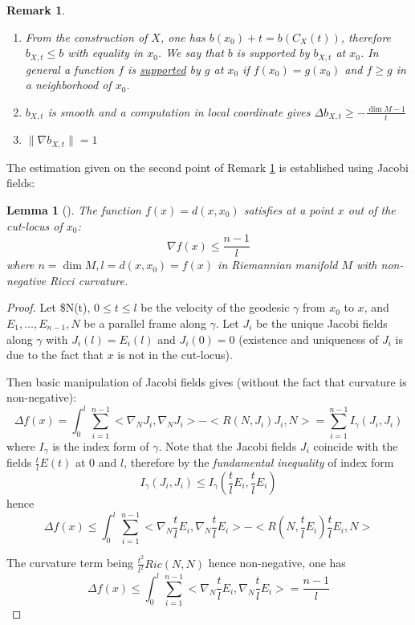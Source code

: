 \documentclass[11pt]{article}
\newtheorem{remark}{Remark}
\newtheorem{lemma}[theorem]{Lemma}
\begin{document}
\begin{remark}
\label{rem:3-calcul-cheeger-gromoll}
\label{org9362523}
\begin{enumerate}
\item From the construction of \(X\), one has \(b(x_0) + t = b(C_X(t))\), therefore \(b_{X,t} \leq b\) with
equality in \(x_0\). We say that \(b\) is supported by \(b_{X,t}\) at \(x_0\). In general a function \(f\) 
is \uline{supported} by \(g\) at \(x_0\) if \(f(x_0)=g(x_0)\) and \(f\geq g\) in a neighborhood of \(x_0\).
\item \(b_{X,t}\) is smooth and a computation in local coordinate gives \(\Delta b_{X,t} \geq -\frac{\dim
   M - 1}{t}\)
\item \(\|\nabla b_{X,t}\| = 1\)
\end{enumerate}
\end{remark}

The estimation given on the second point of Remark \ref{rem:3-calcul-cheeger-gromoll} is established
using Jacobi fields:

\begin{lemma}[]
The function \(f(x) = d(x,x_0)\) satisfies at a point \(x\) out of the cut-locus of \(x_0\):
\[
\nabla f(x) \leq \frac{n-1}{l}
\]
where \(n=\dim M, l = d(x,x_0) = f(x)\) in Riemannian manifold \(M\) with non-negative Ricci curvature.
\end{lemma}

\begin{proof}
Let \$N(t), \(0\leq t \leq l\) be the velocity of the geodesic \(\gamma\) from \(x_0\) to \(x\), and
\(E_1,\dots, E_{n-1},N\) be a parallel frame along \(\gamma\). Let \(J_i\) be the unique Jacobi
fields along \(\gamma\) with \(J_i(l) = E_i(l)\) and \(J_i(0)=0\) (existence and uniqueness of \(J_i\) is
due to the fact that \(x\) is not in the cut-locus).

Then basic manipulation of Jacobi fields gives (without the fact that curvature is non-negative):
\[
\Delta f(x) = \int_0^l \sum_{i=1}^{n-1}<\nabla_N J_i, \nabla_N J_i> - < R(N,J_i)J_i,N > = \sum_{i=1}^{n-1} I_\gamma(J_i,J_i)
\]
where \(I_\gamma\) is the index form of \(\gamma\). Note that the Jacobi fields \(J_i\) coincide with the
fields \(\frac{t}{l}E(t)\) at \(0\) and \(l\), therefore by the \emph{fundamental inequality} of index form
\[
I_\gamma(J_i,J_i)\leq I_\gamma(\frac{t}{l}E_i,\frac{t}{l}E_i)
\]
hence
\[
\Delta f(x) \leq \int_0^l \sum_{i=1}^{n-1}<\nabla_N \frac{t}{l}E_i, \nabla_N \frac{t}{l}E_i> -
< R(N,\frac{t}{l}E_i)\frac{t}{l}E_i,N >
\]

The curvature term being \(\frac{t^2}{l^2}Ric(N,N)\) hence non-negative, one has
\[
\Delta f(x) \leq \int_0^l \sum_{i=1}^{n-1}<\nabla_N \frac{t}{l}E_i, \nabla_N \frac{t}{l}E_i> = \frac{n-1}{l}
\]
\end{proof}
\end{document}
